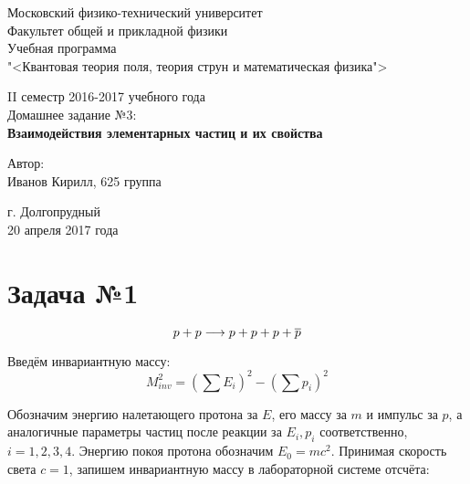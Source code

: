 \documentclass[12pt]{article}
\newcommand{\ov}{\ensuremath{\overline}}
\newcommand{\st}{\ensuremath{\longrightarrow}}
\begin{document}
	
\begin{titlepage}		
\begin{center}
\large 	Московский физико-технический университет \\
Факультет общей и прикладной физики \\
\vspace{0.2cm}
Учебная программа\\
"<Квантовая теория поля, теория струн и математическая физика">

\vspace{4.5cm}
II семестр 2016-2017 учебного года \\ \vspace{0.1cm}
\large Домашнее задание №3: \\ \vspace{0.1cm}
\LARGE \textbf{Взаимодействия элементарных частиц и их свойства}
\end{center}
\vspace{2.3cm} \large

\begin{center}
		 Автор: \\
 Иванов Кирилл,
 625 группа
\vspace{10mm}


\end{center}

\begin{center} \vspace{50mm}
г. Долгопрудный \\ 
20 апреля 2017 года
\end{center}
\end{titlepage}

\section{Задача №1}

\begin{equation}
 p + p \st p + p + p + \ov{p}
\end{equation}

Введём инвариантную массу:
\begin{equation}
M_{inv}^2  = \left(\sum E_i\right)^2 - \left(\sum p_i\right)^2
\end{equation}

Обозначим энергию налетающего протона за $ E  $,  его массу за $ m $ и импульс за $ p $, а аналогичные параметры частиц после реакции за $ E_i, p_i $ соответственно, $ i = 1, 2, 3, 4. $ Энергию покоя протона обозначим $ E_0 = mc^2 $.
Принимая скорость света $ c = 1 $, запишем инвариантную массу в лабораторной системе отсчёта:
\end{document}
